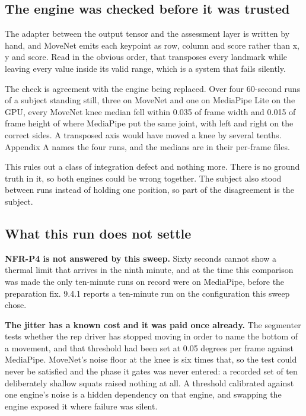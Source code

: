 \subsection{The engine was checked before it was trusted}
\label{sec:4.2.4}

The adapter between the output tensor and the assessment layer is written by hand, and MoveNet emits each keypoint as row, column and score rather than x, y and score. Read in the obvious order, that transposes every landmark while leaving every value inside its valid range, which is a system that fails silently.

The check is agreement with the engine being replaced. Over four 60-second runs of a subject standing still, three on MoveNet and one on MediaPipe Lite on the GPU, every MoveNet knee median fell within 0.035 of frame width and 0.015 of frame height of where MediaPipe put the same joint, with left and right on the correct sides. A transposed axis would have moved a knee by several tenths. Appendix A names the four runs, and the medians are in their per-frame files.

This rules out a class of integration defect and nothing more. There is no ground truth in it, so both engines could be wrong together. The subject also stood between runs instead of holding one position, so part of the disagreement is the subject.

\subsection{What this run does not settle}
\label{sec:4.2.5}

\textbf{NFR-P4 is not answered by this sweep.} Sixty seconds cannot show a thermal limit that arrives in the ninth minute, and at the time this comparison was made the only ten-minute runs on record were on MediaPipe, before the preparation fix. 9.4.1 reports a ten-minute run on the configuration this sweep chose.

\textbf{The jitter has a known cost and it was paid once already.} The segmenter tests whether the rep driver has stopped moving in order to name the bottom of a movement, and that threshold had been set at 0.05 degrees per frame against MediaPipe. MoveNet's noise floor at the knee is six times that, so the test could never be satisfied and the phase it gates was never entered: a recorded set of ten deliberately shallow squats raised nothing at all. A threshold calibrated against one engine's noise is a hidden dependency on that engine, and swapping the engine exposed it where failure was silent.

